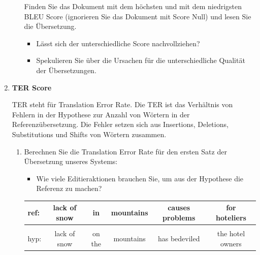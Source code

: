 \documentclass[12pt,fleqn]{article}
\begin{document}
\begin{enumerate}
\begin{enumerate}
\vspace{0.5cm} 
Finden Sie das Dokument mit dem höchsten und mit dem niedrigsten BLEU Score (ignorieren Sie das Dokument mit Score Null) und lesen Sie die Übersetzung.

\vspace{0.5cm} 
\begin{itemize} 
\item Lässt sich der unterschiedliche Score nachvollziehen?
\item Spekulieren Sie über die Ursachen für die unterschiedliche Qualität der Übersetzungen.
\end{itemize} 

\end{enumerate} 

\vspace{0.5cm} 
\item \textbf{TER Score} 

\vspace{0.5cm} 
TER steht für Translation Error Rate. Die TER ist das Verhältnis von Fehlern in der Hypothese zur Anzahl von Wörtern in der Referenzübersetzung. Die Fehler setzen sich aus Insertions, Deletions, Substitutions und Shifts von Wörtern zusammen.

\vspace{0.5cm} 
\begin{enumerate} 
\item Berechnen Sie die Translation Error Rate für den ersten Satz der Übersetzung unseres Systems:


\vspace{0.5cm} 
\begin{itemize} 
 \item Wie viele Editieraktionen brauchen Sie, um aus der Hypothese die Referenz zu machen?
\end{itemize}

\begin{table}[h] 
 \begin{center} 
\begin{tabular}{|l|c|c|c|c|c|} \hline 
ref: & lack of snow & in & mountains & causes problems & for hoteliers \\  \hline 
& & & & &  \\ \hline 
hyp: & lack of snow & on the & mountains & has bedeviled & the hotel owners \\ \hline 
\end{tabular}
 \end{center}
\end{table}


\end{enumerate}
\end{enumerate}
\end{document}
